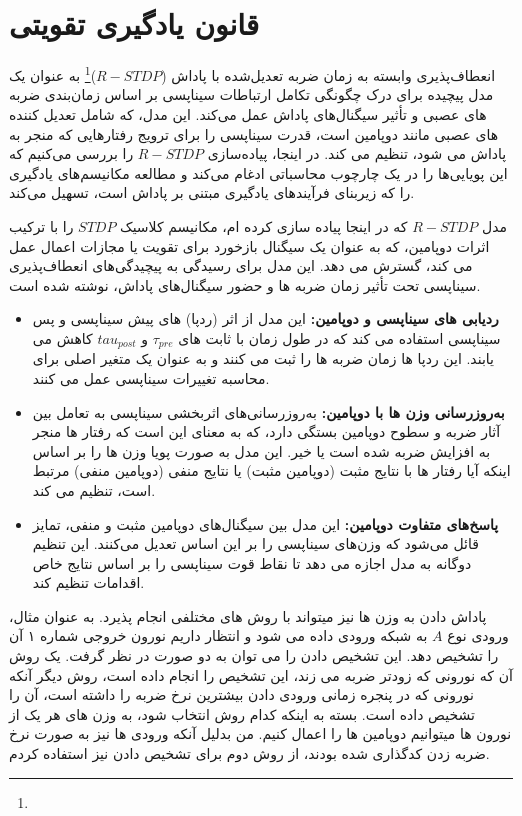 \section{قانون یادگیری تقویتی}
    انعطاف‌پذیری وابسته به زمان ضربه تعدیل‌شده با پاداش 
    ($R-STDP$)\footnote{}
    به عنوان یک مدل پیچیده برای درک چگونگی تکامل ارتباطات سیناپسی بر اساس زمان‌بندی ضربه های عصبی و تأثیر سیگنال‌های پاداش عمل می‌کند. این مدل، که شامل تعدیل کننده های عصبی مانند دوپامین است، قدرت سیناپسی را برای ترویج رفتارهایی که منجر به پاداش می شود، تنظیم می کند. در اینجا، پیاده‌سازی 
    $R-STDP$ 
    را بررسی می‌کنیم که این پویایی‌ها را در یک چارچوب محاسباتی ادغام می‌کند و مطالعه مکانیسم‌های یادگیری را که زیربنای فرآیندهای یادگیری مبتنی بر پاداش است، تسهیل می‌کند.

    مدل 
    $R-STDP$ 
    که در اینجا پیاده سازی کرده ام، مکانیسم کلاسیک 
    $STDP$ 
    را با ترکیب اثرات دوپامین، که به عنوان یک سیگنال بازخورد برای تقویت یا مجازات اعمال عمل می کند، گسترش می دهد. این مدل برای رسیدگی به پیچیدگی‌های انعطاف‌پذیری سیناپسی تحت تأثیر زمان‌ ضربه ها و حضور سیگنال‌های پاداش، نوشته شده است.
    \begin{itemize}
        \item \textbf{ردیابی های سیناپسی و دوپامین:} 
        این مدل از اثر 
        (ردپا)
        های پیش سیناپسی و پس سیناپسی استفاده می کند که در طول زمان با ثابت های 
        $\tau_{pre}$ 
        و 
        $tau_{post}$ 
        کاهش می یابند. این ردپا ها زمان ضربه ها را ثبت می کنند و به عنوان یک متغیر اصلی برای محاسبه تغییرات سیناپسی عمل می کنند.
        \item \textbf{به‌روزرسانی‌ وزن ها با دوپامین:} 
        به‌روزرسانی‌های اثربخشی سیناپسی به تعامل بین آثار ضربه و سطوح دوپامین بستگی دارد، که به معنای این است که رفتار ها منجر به افزایش ضربه شده است یا خیر. این مدل به صورت پویا وزن ها را بر اساس اینکه آیا رفتار ها با نتایج مثبت 
        (دوپامین مثبت) 
        یا نتایج منفی 
        (دوپامین منفی) 
        مرتبط است، تنظیم می کند.
        \item \textbf{پاسخ‌های متفاوت دوپامین:} 
        این مدل بین سیگنال‌های دوپامین مثبت و منفی، تمایز قائل می‌شود که وزن‌های سیناپسی را بر این اساس تعدیل می‌کنند. این تنظیم دوگانه به مدل اجازه می دهد تا نقاط قوت سیناپسی را بر اساس نتایج خاص اقدامات تنظیم کند.
    \end{itemize}
    پاداش دادن به وزن ها نیز میتواند با روش های مختلفی انجام پذیرد. به عنوان مثال، ورودی نوع 
    $A$ 
    به شبکه ورودی داده می شود و انتظار داریم نورون خروجی شماره ۱ آن را تشخیص دهد. این تشخیص دادن را می توان به دو صورت در نظر گرفت. یک روش آن که نورونی که زودتر ضربه می زند، این تشخیص را انجام داده است، روش دیگر آنکه نورونی که در پنجره زمانی ورودی دادن بیشترین نرخ ضربه را داشته است، آن را تشخیص داده است. بسته به اینکه کدام روش انتخاب شود، به وزن های هر یک از نورون ها میتوانیم دوپامین ها را اعمال کنیم. من بدلیل آنکه ورودی ها نیز به صورت نرخ ضربه زدن کدگذاری شده بودند، از روش دوم برای تشخیص دادن نیز استفاده کردم.

